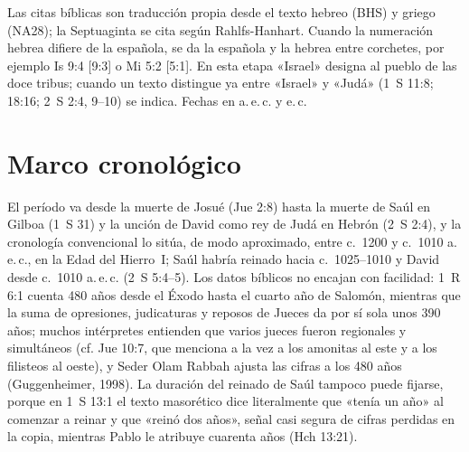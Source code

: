 \documentclass[11pt,letterpaper]{article}
\begin{document}
\begin{nota}
Las citas bíblicas son traducción propia desde el texto hebreo (BHS) y griego (NA28); la Septuaginta se cita según Rahlfs-Hanhart. Cuando la numeración hebrea difiere de la española, se da la española y la hebrea entre corchetes, por ejemplo Is 9:4 [9:3] o Mi 5:2 [5:1]. En esta etapa «Israel» designa al pueblo de las doce tribus; cuando un texto distingue ya entre «Israel» y «Judá» (1~S 11:8; 18:16; 2~S 2:4, 9--10) se indica. Fechas en a.\,e.\,c. y e.\,c.
\end{nota}

\section{Marco cronológico}

El período va desde la muerte de Josué (Jue 2:8) hasta la muerte de Saúl en Gilboa (1~S 31) y la unción de David como rey de Judá en Hebrón (2~S 2:4), y la cronología convencional lo sitúa, de modo aproximado, entre c.~1200 y c.~1010 a.\,e.\,c., en la Edad del Hierro~I; Saúl habría reinado hacia c.~1025--1010 y David desde c.~1010 a.\,e.\,c. (2~S 5:4--5). Los datos bíblicos no encajan con facilidad: 1~R 6:1 cuenta 480 años desde el Éxodo hasta el cuarto año de Salomón, mientras que la suma de opresiones, judicaturas y reposos de Jueces da por sí sola unos 390 años; muchos intérpretes entienden que varios jueces fueron regionales y simultáneos (cf. Jue 10:7, que menciona a la vez a los amonitas al este y a los filisteos al oeste), y Seder Olam Rabbah ajusta las cifras a los 480 años (Guggenheimer, 1998). La duración del reinado de Saúl tampoco puede fijarse, porque en 1~S 13:1 el texto masorético dice literalmente que «tenía un año» al comenzar a reinar y que «reinó dos años», señal casi segura de cifras perdidas en la copia, mientras Pablo le atribuye cuarenta años (Hch 13:21).
\end{document}
